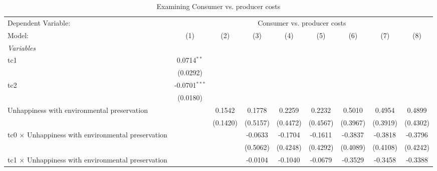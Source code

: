 
\begin{table}[htbp]
   \caption{Examining Consumer vs. producer costs}
   \centering
   \begin{tabular}{lcccccccc}
      \tabularnewline \midrule \midrule
      Dependent Variable: & \multicolumn{8}{c}{Consumer vs. producer costs}\\
      Model:                                                    & (1)             & (2)      & (3)      & (4)          & (5)          & (6)          & (7)          & (8)\\  
      \midrule
      \emph{Variables}\\
      tc1                                                       & 0.0714$^{**}$   &          &          &              &              &              &              &   \\   
                                                                & (0.0292)        &          &          &              &              &              &              &   \\   
      tc2                                                       & -0.0701$^{***}$ &          &          &              &              &              &              &   \\   
                                                                & (0.0180)        &          &          &              &              &              &              &   \\   
      Unhappiness with environmental preservation               &                 & 0.1542   & 0.1778   & 0.2259       & 0.2232       & 0.5010       & 0.4954       & 0.4899\\   
                                                                &                 & (0.1420) & (0.5157) & (0.4472)     & (0.4567)     & (0.3967)     & (0.3919)     & (0.4302)\\   
      tc0 $\times$ Unhappiness with environmental preservation  &                 &          & -0.0633  & -0.1704      & -0.1611      & -0.3837      & -0.3818      & -0.3796\\   
                                                                &                 &          & (0.5062) & (0.4248)     & (0.4292)     & (0.4089)     & (0.4108)     & (0.4242)\\   
      tc1 $\times$ Unhappiness with environmental preservation  &                 &          & -0.0104  & -0.1040      & -0.0679      & -0.3529      & -0.3458      & -0.3388\\   

\end{tabular}
\end{table}

